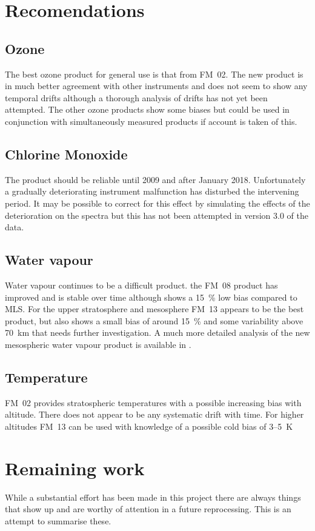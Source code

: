 \section{Recomendations}
\subsection{Ozone}
The best ozone product for general use is that from FM~02.  The new product is
in much better agreement with other instruments and does not seem to show any
temporal drifts although a thorough analysis of drifts has not yet been
attempted.  The other ozone products show some biases but could be used in
conjunction with simultaneously measured products if account is taken of this.

\subsection{Chlorine Monoxide}
The  product should be reliable until 2009 and after January 2018.
Unfortunately a gradually deteriorating instrument malfunction has disturbed
the intervening period.  It may be possible to correct for this effect by simulating the effects of the deterioration on the spectra but this has not been attempted in version 3.0 of the data.

\subsection{Water vapour}
Water vapour continues to be a difficult product. the FM~08 product has
improved and is stable over time although shows a 15~\% low bias compared to
MLS.  For the upper stratosphere and mesosphere FM~13 appears to be the best
product, but also shows a small bias of around 15~\% and some variability above
70~km that needs further investigation.  A much more detailed analysis of the new mesospheric water vapour product is available in \cite{grieco2020b}.

\subsection{Temperature}
FM~02 provides stratospheric temperatures with a possible increasing bias with
altitude. There does not appear to be any systematic drift with time. For
higher altitudes FM~13 can be used with knowledge of a possible cold bias of
3--5~K

\section{Remaining work}
While a substantial effort has been made in this project there are always things that show up and are worthy of attention in a future reprocessing. This is an attempt to summarise these.

